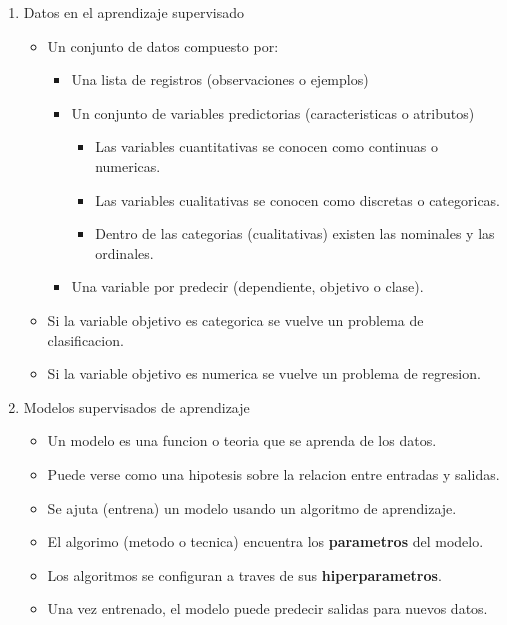 \documentclass[11pt]{article}
\begin{document}
\begin{enumerate}
\item Datos en el aprendizaje supervisado
\label{sec:orgd57ac84}
\begin{itemize}
\item Un conjunto de datos compuesto por:
\begin{itemize}
\item Una lista de registros (observaciones o ejemplos)
\item Un conjunto de variables predictorias (caracteristicas o atributos)
\begin{itemize}
\item Las variables cuantitativas se conocen como continuas o numericas.
\item Las variables cualitativas se conocen como discretas o categoricas.
\item Dentro de las categorias (cualitativas) existen las nominales y las ordinales.
\end{itemize}
\item Una variable por predecir (dependiente, objetivo o clase).
\end{itemize}
\item Si la variable objetivo es categorica se vuelve un problema de clasificacion.
\item Si la variable objetivo es numerica se vuelve un problema de regresion.
\end{itemize}
\item Modelos supervisados de aprendizaje
\label{sec:orgaea1cb2}
\begin{itemize}
\item Un modelo es una funcion o teoria que se aprenda de los datos.
\item Puede verse como una hipotesis sobre la relacion entre entradas y salidas.
\item Se ajuta (entrena) un modelo usando un algoritmo de aprendizaje.
\item El algorimo (metodo o tecnica) encuentra los \textbf{parametros} del modelo.
\item Los algoritmos se configuran a traves de sus \textbf{hiperparametros}.
\item Una vez entrenado, el modelo puede predecir salidas para nuevos datos.


\end{itemize}
\end{enumerate}
\end{document}
